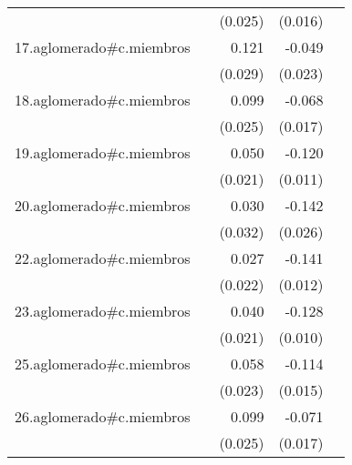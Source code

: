 {\begin{longtable}{l*{4}{D{.}{.}{-1}}}
            &                     &     (0.025)         &     (0.016)         &                     \\
\addlinespace
17.aglomerado#c.miembros&                     &       0.121\sym{***}&      -0.049\sym{*}  &                     \\
            &                     &     (0.029)         &     (0.023)         &                     \\
\addlinespace
18.aglomerado#c.miembros&                     &       0.099\sym{***}&      -0.068\sym{***}&                     \\
            &                     &     (0.025)         &     (0.017)         &                     \\
\addlinespace
19.aglomerado#c.miembros&                     &       0.050\sym{*}  &      -0.120\sym{***}&                     \\
            &                     &     (0.021)         &     (0.011)         &                     \\
\addlinespace
20.aglomerado#c.miembros&                     &       0.030         &      -0.142\sym{***}&                     \\
            &                     &     (0.032)         &     (0.026)         &                     \\
\addlinespace
22.aglomerado#c.miembros&                     &       0.027         &      -0.141\sym{***}&                     \\
            &                     &     (0.022)         &     (0.012)         &                     \\
\addlinespace
23.aglomerado#c.miembros&                     &       0.040         &      -0.128\sym{***}&                     \\
            &                     &     (0.021)         &     (0.010)         &                     \\
\addlinespace
25.aglomerado#c.miembros&                     &       0.058\sym{*}  &      -0.114\sym{***}&                     \\
            &                     &     (0.023)         &     (0.015)         &                     \\
\addlinespace
26.aglomerado#c.miembros&                     &       0.099\sym{***}&      -0.071\sym{***}&                     \\
            &                     &     (0.025)         &     (0.017)         &                     \\

\end{longtable}}
